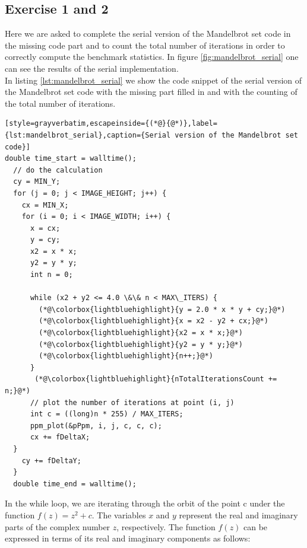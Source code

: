 \documentclass[unicode,10pt,a4paper,oneside,numbers=endperiod,openany]{scrartcl}
\begin{document}
\subsection{Exercise 1 and 2}
Here we are asked to complete the serial version of the Mandelbrot set code in the missing code part and to count the total number of iterations in order to correctly compute the benchmark statistics. In figure \ref{fig:mandelbrot_serial} one can see the results of the serial implementation.\\
In listing \ref{lst:mandelbrot_serial} we show the code snippet of the serial version of the Mandelbrot set code with the missing part filled in and with the counting of the total number of iterations.
\begin{lstlisting}[style=grayverbatim,escapeinside={(*@}{@*)},label={lst:mandelbrot_serial},caption={Serial version of the Mandelbrot set code}]
double time_start = walltime();
  // do the calculation
  cy = MIN_Y;
  for (j = 0; j < IMAGE_HEIGHT; j++) {
    cx = MIN_X;
    for (i = 0; i < IMAGE_WIDTH; i++) {
      x = cx;
      y = cy;
      x2 = x * x;
      y2 = y * y;
      int n = 0;
      
      while (x2 + y2 <= 4.0 \&\& n < MAX\_ITERS) { 
        (*@\colorbox{lightbluehighlight}{y = 2.0 * x * y + cy;}@*)
        (*@\colorbox{lightbluehighlight}{x = x2 - y2 + cx;}@*)
        (*@\colorbox{lightbluehighlight}{x2 = x * x;}@*)
        (*@\colorbox{lightbluehighlight}{y2 = y * y;}@*)
        (*@\colorbox{lightbluehighlight}{n++;}@*)
      }
       (*@\colorbox{lightbluehighlight}{nTotalIterationsCount += n;}@*)
      // plot the number of iterations at point (i, j)
      int c = ((long)n * 255) / MAX_ITERS;
      ppm_plot(&pPpm, i, j, c, c, c);
      cx += fDeltaX;
  }
    cy += fDeltaY;
  }
  double time_end = walltime();
\end{lstlisting}
In the while loop, we are iterating through the orbit of the point c under the function $f(z) = z^2 + c$. The variables $x$ and $y$ represent the real and imaginary parts of the complex number $z$, respectively. The function $f(z)$ can be expressed in terms of its real and imaginary components as follows:
\end{document}
